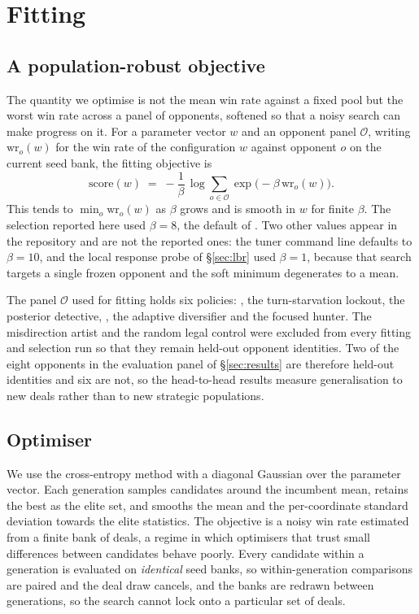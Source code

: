 \section{Fitting}
\label{sec:fitting}

\subsection{A population-robust objective}

The quantity we optimise is not the mean win rate against a fixed pool but the
worst win rate across a panel of opponents, softened so that a noisy search can
make progress on it. For a parameter vector $w$ and an opponent panel
$\mathcal{O}$, writing $\mathrm{wr}_o(w)$ for the win rate of the configuration
$w$ against opponent $o$ on the current seed bank, the fitting objective is
\begin{equation}
  \mathrm{score}(w) \;=\; -\frac{1}{\beta}\,
     \log \sum_{o \in \mathcal{O}} \exp\bigl(-\beta\, \mathrm{wr}_o(w)\bigr).
  \label{eq:softmin}
\end{equation}
This tends to $\min_o \mathrm{wr}_o(w)$ as $\beta$ grows and is smooth in $w$ for
finite $\beta$. The selection reported here used $\beta = 8$, the default of
. Two other values appear in the repository and
are not the reported ones: the tuner command line defaults to $\beta = 10$, and
the local response probe of \S\ref{sec:lbr} used $\beta = 1$, because that search
targets a single frozen opponent and the soft minimum degenerates to a mean.

The panel $\mathcal{O}$ used for fitting holds six policies: \vthree{}, the
turn-starvation lockout, the posterior detective, \vtwo{}, the adaptive
diversifier and the focused hunter. The misdirection artist and the random legal
control were excluded from every fitting and selection run so that they remain
held-out opponent identities. Two of the eight opponents in the evaluation panel
of \S\ref{sec:results} are therefore held-out identities and six are not, so the
head-to-head results measure generalisation to new deals rather than to new
strategic populations.

\subsection{Optimiser}

We use the cross-entropy method with a diagonal Gaussian over the parameter
vector. Each generation samples \numCEMPop{} candidates around the incumbent
mean, retains the \numCEMElite{} best as the elite set, and smooths the mean and
the per-coordinate standard deviation towards the elite statistics. The objective
is a noisy win rate estimated from a finite bank of deals, a regime in which
optimisers that trust small differences between candidates behave poorly. Every
candidate within a generation is evaluated on \emph{identical} seed banks, so
within-generation comparisons are paired and the deal draw cancels, and the banks
are redrawn between generations, so the search cannot lock onto a particular set
of deals.

